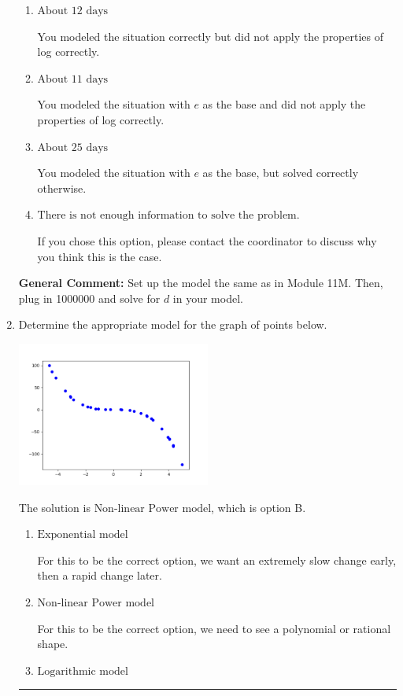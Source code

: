 \documentclass{extbook}[14pt]
\newcommand{\litem}[1]{\item #1

\rule{\textwidth}{0.4pt}}
\begin{document}
\begin{enumerate}
{\begin{enumerate}[label=\Alph*.]
* This is the correct option.
\item \( \text{About } 12 \text{ days} \)

You modeled the situation correctly but did not apply the properties of log correctly.
\item \( \text{About } 11 \text{ days} \)

You modeled the situation with $e$ as the base and did not apply the properties of log correctly.
\item \( \text{About } 25 \text{ days} \)

You modeled the situation with $e$ as the base, but solved correctly otherwise.
\item \( \text{There is not enough information to solve the problem.} \)

If you chose this option, please contact the coordinator to discuss why you think this is the case.
\end{enumerate}

\textbf{General Comment:} Set up the model the same as in Module 11M. Then, plug in 1000000 and solve for $d$ in your model.
}
\litem{
Determine the appropriate model for the graph of points below.

\begin{center}
    \includegraphics[width=0.5\textwidth]{../Figures/identifyModelGraph12CopyC.png}
\end{center}


The solution is \( \text{Non-linear Power model} \), which is option B.\begin{enumerate}[label=\Alph*.]
\item \( \text{Exponential model} \)

For this to be the correct option, we want an extremely slow change early, then a rapid change later.
\item \( \text{Non-linear Power model} \)

For this to be the correct option, we need to see a polynomial or rational shape.
\item \( \text{Logarithmic model} \)


\end{enumerate}}
\end{enumerate}
\end{document}

